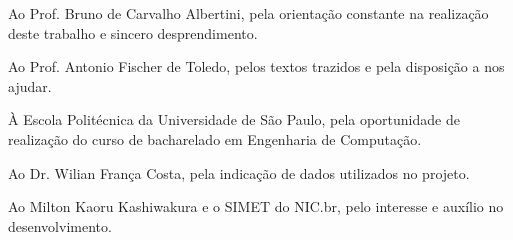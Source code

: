 \documentclass[]{politex}
\begin{document}
\capa
\falsafolhaderosto
\folhaderosto








\begin{agradecimentos}

Ao Prof. Bruno de Carvalho Albertini, pela orientação constante na realização
deste trabalho e sincero desprendimento.

Ao Prof. Antonio Fischer de Toledo, pelos textos trazidos e pela disposição a
nos ajudar.

À Escola Politécnica da Universidade de São Paulo, pela oportunidade de
realização do curso de bacharelado em Engenharia de Computação.

Ao Dr. Wilian França Costa, pela indicação de dados utilizados no projeto.

Ao Milton Kaoru Kashiwakura e o SIMET do NIC.br, pelo interesse e auxílio no
desenvolvimento.

\end{agradecimentos}


\end{document}
